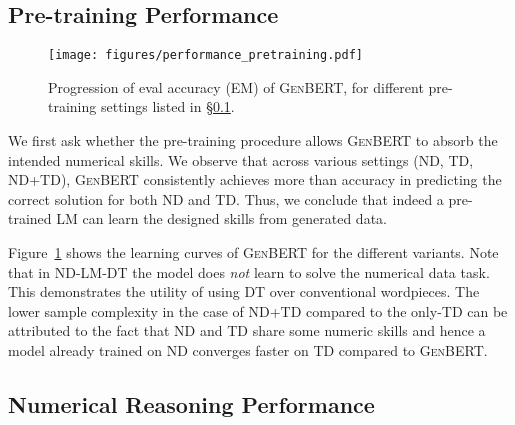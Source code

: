 \documentclass[11pt,a4paper]{article}
\newcommand\genbert{\textsc{GenBERT}}
\begin{document}
\subsection{Pre-training Performance}
 \label{section:pretraining_results}
 
\begin{figure}
\setlength{\belowcaptionskip}{-15pt}
    \centering
    \texttt{[image: figures/performance\_pretraining.pdf]}
    \caption{Progression of eval accuracy (EM) of \genbert{}, for different pre-training settings listed in \S\ref{section:pretraining_results}.}
    \label{figure:performance_pretraining}
\end{figure}



We first ask whether the pre-training procedure allows \genbert{} to absorb the intended numerical skills. We observe that across various settings (ND, TD, ND+TD), \genbert{} consistently achieves more than  accuracy in predicting the correct solution for both ND and TD. Thus, we conclude that indeed a pre-trained LM can learn the designed skills from generated data.

Figure~\ref{figure:performance_pretraining} shows the learning curves of \genbert{} for the different variants. 
Note that in \textsc{ND-LM-DT} the model does \emph{not} learn to solve the numerical data task. This demonstrates the utility of using DT over conventional wordpieces. The lower sample complexity in the case of \textsc{ND+TD} compared to the only-\textsc{TD} can be attributed to the fact that ND and TD share some numeric skills and hence a model already trained on ND converges faster on TD compared to \genbert{}.















\subsection{Numerical Reasoning Performance}
\label{section:numerical_reasoning_performance}
\end{document}
